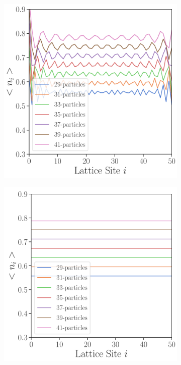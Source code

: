 \documentclass[11pt, a4paper]{article}
\theoremstyle{definition} %
\begin{document}
	
\begin{figure}[h]
\centering
\begin{subfigure}[t]{0.49\textwidth}
	\centering
	\includegraphics[width =\textwidth]{Occupation_number_H0_OBC}
	\caption{}
\end{subfigure}
\begin{subfigure}[t]{0.49\textwidth}
	\centering
	\includegraphics[width =\textwidth]{Occupation_number_H0_PBC}
	\caption{}
\end{subfigure}
\caption{}
\end{figure}
\end{document}
